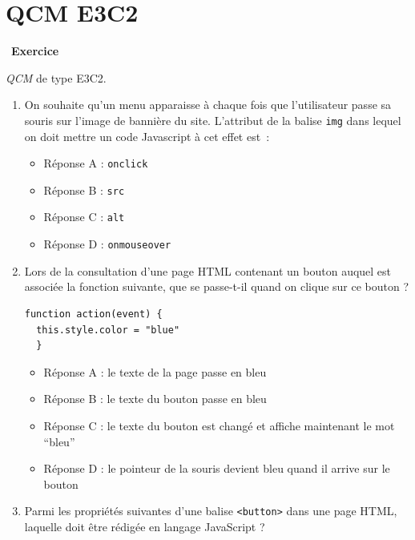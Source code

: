 \documentclass[
  11pt,
]{article}
\newcommand{\passthrough}[1]{#1}
\providecommand{\tightlist}{%
  \setlength{\itemsep}{0pt}\setlength{\parskip}{0pt}}
\newcounter{exo}
\newenvironment{exercice}[1]
{\par \medskip   \addtocounter{exo}{1} \noindent  
\begin{bclogo}[arrondi =0.1,   noborder = true, logo=\bccrayon, marge=4]{~\textbf{Exercice} \textbf{\theexo} {\itshape #1} }  \par}
{
\end{bclogo}
 \par \bigskip }
\newcounter{prop}
\newcounter{def}
\begin{document}
\hypertarget{qcm-e3c2}{%
\section{QCM E3C2}\label{qcm-e3c2}}

\begin{exercice}{}

\emph{QCM} de type E3C2.

\begin{enumerate}
\def\labelenumi{\arabic{enumi}.}
\item
  On souhaite qu'un menu apparaisse à chaque fois que l'utilisateur
  passe sa souris sur l'image de bannière du site. L'attribut de la
  balise \passthrough{\lstinline!img!} dans lequel on doit mettre un
  code Javascript à cet effet est~:

  \begin{itemize}
  \tightlist
  \item
    Réponse A : \passthrough{\lstinline!onclick!}
  \item
    Réponse B : \passthrough{\lstinline!src!}
  \item
    Réponse C : \passthrough{\lstinline!alt!}
  \item
    Réponse D : \passthrough{\lstinline!onmouseover!}
  \end{itemize}
\item
  Lors de la consultation d'une page HTML contenant un bouton auquel est
  associée la fonction suivante, que se passe-t-il quand on clique sur
  ce bouton ?

\begin{lstlisting}
function action(event) {
  this.style.color = "blue"
  }
\end{lstlisting}

  \begin{itemize}
  \tightlist
  \item
    Réponse A : le texte de la page passe en bleu
  \item
    Réponse B : le texte du bouton passe en bleu
  \item
    Réponse C : le texte du bouton est changé et affiche maintenant le
    mot ``bleu''
  \item
    Réponse D : le pointeur de la souris devient bleu quand il arrive
    sur le bouton
  \end{itemize}
\item
  Parmi les propriétés suivantes d'une balise
  \passthrough{\lstinline!<button>!} dans une page HTML, laquelle doit
  être rédigée en langage JavaScript ?


\end{enumerate}
\end{exercice}
\end{document}
